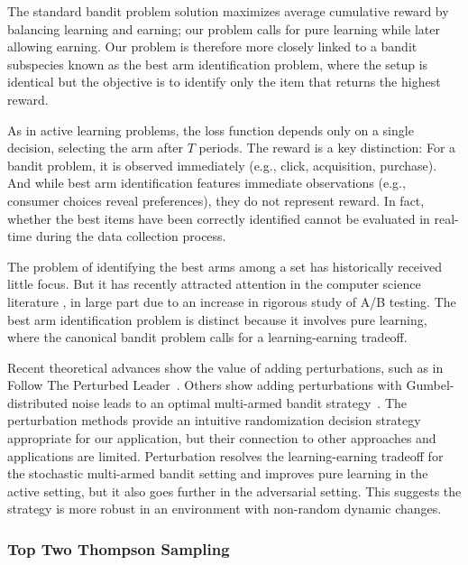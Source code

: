 \documentclass[nonblindrev]{informs3}
\begin{document}
The standard bandit problem solution maximizes average cumulative reward by balancing learning and earning; our problem calls for pure learning while later allowing earning. Our problem is therefore more closely linked to a bandit subspecies known as the best arm identification problem, where the setup is identical but the objective is to identify only the item that returns the highest reward. 

As in active learning problems, the loss function depends only on a single decision, selecting the arm after $T$ periods. The reward is a key distinction: For a bandit problem, it is observed immediately (e.g., click, acquisition, purchase). And while best arm identification features immediate observations (e.g., consumer choices reveal preferences), they do not represent reward. In fact, whether the best items have been correctly identified cannot be evaluated in real-time during the data collection process. 

The problem of identifying the best arms among a set has historically received little focus. But it has recently attracted attention in the computer science literature \citep{gabillon2012best,jamieson2014lil,kalyanakrishnan2012pac,kaufmann2016complexity,kaufmann2013information,russo2016simple}, in large part due to an increase in rigorous study of A/B testing. The best arm identification problem is distinct because it involves pure learning, where the canonical bandit problem calls for a learning-earning tradeoff. 

Recent theoretical advances show the value of adding perturbations, such as in Follow The Perturbed Leader~\citep{kalai2005efficient}. Others show adding perturbations with Gumbel-distributed noise leads to an optimal multi-armed bandit strategy~\citep{abernethy2015fighting,kujala2005following}. The perturbation methods provide an intuitive randomization decision strategy appropriate for our application, but their connection to other approaches and applications are limited. Perturbation resolves the learning-earning tradeoff for the stochastic multi-armed bandit setting and improves pure learning in the active setting, but it also goes further in the adversarial setting. This suggests the strategy is more robust in an environment with non-random dynamic changes.


\subsubsection{Top Two Thompson Sampling}
\cite{russo2016simple}
\end{document}
